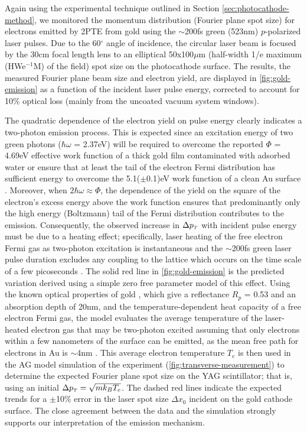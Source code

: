 Again using the experimental technique outlined in Section \ref{sec:photocathode-method}, we monitored the momentum distribution (Fourier plane spot size) for electrons emitted by 2PTE from gold using the $\sim$200fs green (523nm) $p$-polarized laser pulses.
Due to the 60$^{\circ}$ angle of incidence, the circular laser beam is focused by the 30cm focal length lens to an elliptical 50x100$\mu$m (half-width 1/e maximum (HWe$^{-1}$M) of the field) spot size on the photocathode surface.
The results, the measured Fourier plane beam size and electron yield, are displayed in \ref{fig:gold-emission} as a function of the incident laser pulse energy, corrected to account for 10\% optical loss (mainly from the uncoated vacuum system windows).

The quadratic dependence of the electron yield on pulse energy clearly indicates a two-photon emission process.
This is expected since an excitation energy of two green photons ($\hbar \omega$ = 2.37eV) will be required to overcome the reported $\Phi$ = 4.69eV effective work function of a thick gold film contaminated with adsorbed water \cite{monjushiro_ultraviolet_1991} or ensure that at least the tail of the electron Fermi distribution has sufficient energy to overcome the 5.1($\pm$0.1)eV work function of a clean Au surface \cite{eastman_photoelectric_1970}.
Moreover, when $2\hbar \omega \approx \Phi$, the dependence of the yield on the square of the electron's excess energy above the work function \cite{monjushiro_ultraviolet_1991} ensures that predominantly only the high energy (Boltzmann) tail of the Fermi distribution contributes to the emission.
Consequently, the observed increase in $\Delta p_{{\scriptscriptstyle T}}$ with incident pulse energy must be due to a heating effect; specifically, laser heating of the free electron Fermi gas as two-photon excitation is instantaneous and the $\sim$200fs green laser pulse duration excludes any coupling to the lattice which occurs on the time scale of a few picoseconds \cite{chen_semiclassical_2006}.
The solid red line in \ref{fig:gold-emission} is the predicted variation derived using a simple zero free parameter model of this effect.
Using the known optical properties of gold \cite{johnson_optical_1972}, which give a reflectance $R_p$ = 0.53 and an absorption depth of 20nm, and the temperature-dependent heat capacity of a free electron Fermi gas, the model evaluates the average temperature of the laser-heated electron gas that may be two-photon excited assuming that only electrons within a few nanometers of the surface can be emitted, as the mean free path for electrons in Au is $\sim$4nm \cite{seah_quantitative_1979}.
This average electron temperature $T_e$ is then used in the AG model simulation of the experiment (\ref{fig:transverse-measurement}) to determine the expected Fourier plane spot size on the YAG scintillator; that is, using an initial $\Delta p_{{\scriptscriptstyle T}} = \sqrt{m k_B T_e}$.  The dashed red lines indicate the expected trends for a $\pm$10\% error in the laser spot size $\Delta x_0$ incident on the gold cathode surface.
The close agreement between the data and the simulation strongly supports our interpretation of the emission mechanism.

